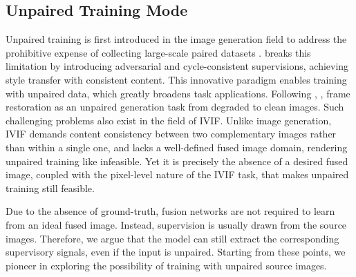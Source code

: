 \subsection{Unpaired Training Mode}
Unpaired training is first introduced in the image generation field to address the prohibitive expense of collecting large-scale paired datasets \cite{pix2pix}. 
\cite{cyclegan} breaks this limitation by introducing adversarial and cycle-consistent supervisions, achieving style transfer with consistent content.  
This innovative paradigm enables training with unpaired data, which greatly broadens task applications. 
Following \cite{cyclegan}, \cite{unpaire_restoration1}, \cite{unpaire_restoration2} frame restoration as an unpaired generation task from degraded to clean images. 
Such challenging problems also exist in the field of IVIF.
Unlike image generation, IVIF demands content consistency between two complementary images rather than within a single one, and lacks a well-defined fused image domain, rendering unpaired training like \cite{cyclegan} infeasible. 
Yet it is precisely the absence of a desired fused image, coupled with the pixel-level nature of the IVIF task, that makes unpaired training still feasible.


Due to the absence of ground-truth, fusion networks are not required to learn from an ideal fused image. 
Instead, supervision is usually drawn from the source images.
Therefore, we argue that the model can still extract the corresponding supervisory signals, even if the input is unpaired. 
Starting from these points, we pioneer in exploring the possibility of training with unpaired source images. 
